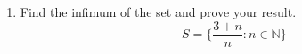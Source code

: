 \documentclass[12pt]{article}
\begin{document}
\begin{enumerate}
\begin{proof}
\begin{gather*}
                2-\frac{1}{n} < x-2 < 0 \\
                0 < 2-x < \frac{1}{n} - 2 \\
            \end{gather*}
            Since $2-x > 0$ by Archimedean Property $\exists m \in \mathbb{N}$ s.t.
            \begin{align*}
                2-x > \frac{1}{m} \\
                \implies -x > \frac{1}{m}-2 \\
                \implies x < 2-\frac{1}{m}
            \end{align*}
            but $x > 2-\frac{1}{n} \ \forall n \in \mathbb{N}$. $\therefore \bigcap_{n=1}^{\infty}I_n = \emptyset$
	      \end{proof}
    \item Find the infimum of the set and prove your result.
          \begin{equation*}
              S = \bigg\{\frac{3+n}{n}:n \in \mathbb{N}\bigg\}
          \end{equation*}
\end{enumerate}
\end{document}
